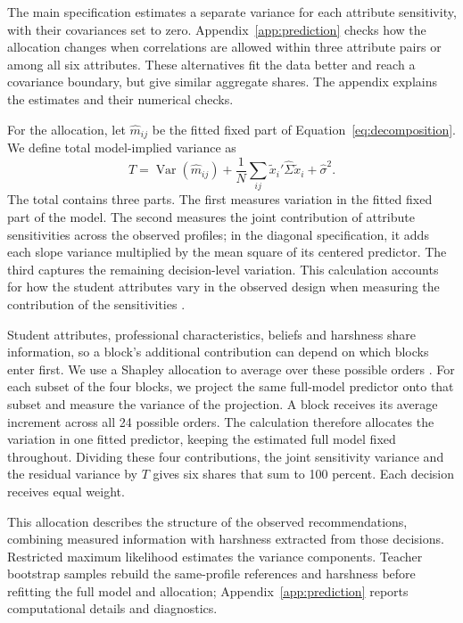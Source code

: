 The main specification estimates a separate variance for each attribute sensitivity, with their covariances set to zero. Appendix~\ref{app:prediction} checks how the allocation changes when correlations are allowed within three attribute pairs or among all six attributes. These alternatives fit the data better and reach a covariance boundary, but give similar aggregate shares. The appendix explains the estimates and their numerical checks.

For the allocation, let $\widehat m_{ij}$ be the fitted fixed part of Equation~\ref{eq:decomposition}. We define total model-implied variance as
\begin{equation}
T=\operatorname{Var}(\widehat m_{ij})+
\frac{1}{N}\sum_{ij}\widetilde{x}_i'\widehat\Sigma\widetilde{x}_i+
\widehat\sigma^2.
\label{eq:variance_total}
\end{equation}
The total contains three parts. The first measures variation in the fitted fixed part of the model. The second measures the joint contribution of attribute sensitivities across the observed profiles; in the diagonal specification, it adds each slope variance multiplied by the mean square of its centered predictor. The third captures the remaining decision-level variation. This calculation accounts for how the student attributes vary in the observed design when measuring the contribution of the sensitivities \citep{nakagawa}.

Student attributes, professional characteristics, beliefs and harshness share information, so a block's additional contribution can depend on which blocks enter first. We use a Shapley allocation to average over these possible orders \citep{groemping}. For each subset of the four blocks, we project the same full-model predictor onto that subset and measure the variance of the projection. A block receives its average increment across all 24 possible orders. The calculation therefore allocates the variation in one fitted predictor, keeping the estimated full model fixed throughout. Dividing these four contributions, the joint sensitivity variance and the residual variance by $T$ gives six shares that sum to 100 percent. Each decision receives equal weight.

This allocation describes the structure of the observed recommendations, combining measured information with harshness extracted from those decisions. Restricted maximum likelihood estimates the variance components. Teacher bootstrap samples rebuild the same-profile references and harshness before refitting the full model and allocation; Appendix~\ref{app:prediction} reports computational details and diagnostics.

